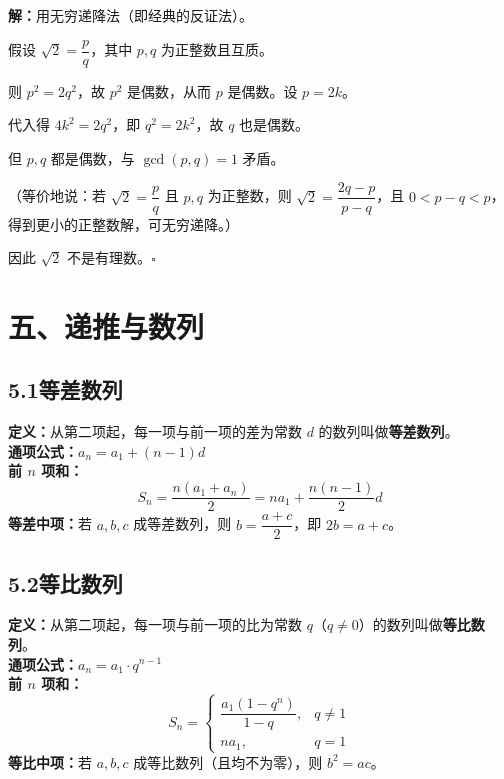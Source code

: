 \documentclass[12pt, a4paper]{ctexart}
\begin{document}
\textbf{解：}\;用无穷递降法（即经典的反证法）。

假设 $\sqrt{2}=\dfrac{p}{q}$，其中 $p,q$ 为正整数且互质。

则 $p^2=2q^2$，故 $p^2$ 是偶数，从而 $p$ 是偶数。设 $p=2k$。

代入得 $4k^2=2q^2$，即 $q^2=2k^2$，故 $q$ 也是偶数。

但 $p,q$ 都是偶数，与 $\gcd(p,q)=1$ 矛盾。

（等价地说：若 $\sqrt{2}=\dfrac{p}{q}$ 且 $p,q$ 为正整数，则 $\sqrt{2}=\dfrac{2q-p}{p-q}$，且 $0<p-q<p$，得到更小的正整数解，可无穷递降。）

因此 $\sqrt{2}$ 不是有理数。\hfill$\square$

\newpage
\section*{\textcolor{mainblue}{五、递推与数列}}

\subsection*{5.1\quad 等差数列}

\begin{knowledgebox}[等差数列]
\textbf{定义：}从第二项起，每一项与前一项的差为常数 $d$ 的数列叫做\textbf{等差数列}。\\[6pt]
\textbf{通项公式：}$a_n=a_1+(n-1)d$\\[4pt]
\textbf{前 $n$ 项和：}
\[S_n = \frac{n(a_1+a_n)}{2} = na_1+\frac{n(n-1)}{2}d\]
\textbf{等差中项：}若 $a,b,c$ 成等差数列，则 $b=\dfrac{a+c}{2}$，即 $2b=a+c$。
\end{knowledgebox}

\subsection*{5.2\quad 等比数列}

\begin{knowledgebox}[等比数列]
\textbf{定义：}从第二项起，每一项与前一项的比为常数 $q$（$q\neq 0$）的数列叫做\textbf{等比数列}。\\[6pt]
\textbf{通项公式：}$a_n=a_1\cdot q^{n-1}$\\[4pt]
\textbf{前 $n$ 项和：}
\[
S_n = \begin{cases}
\dfrac{a_1(1-q^n)}{1-q}, & q\neq 1\\[8pt]
na_1, & q=1
\end{cases}
\]
\textbf{等比中项：}若 $a,b,c$ 成等比数列（且均不为零），则 $b^2=ac$。
\end{knowledgebox}
\end{document}
